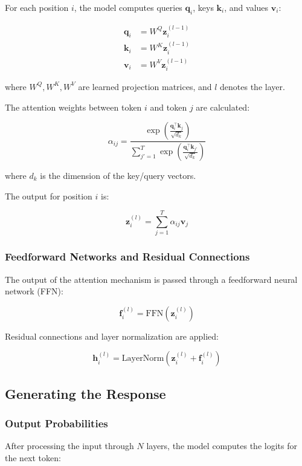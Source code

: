 \documentclass[12pt]{article}
\begin{document}
For each position \( i \), the model computes queries \( \mathbf{q}_i \), keys \( \mathbf{k}_i \), and values \( \mathbf{v}_i \):

\[
\begin{aligned}
\mathbf{q}_i &= W^Q \mathbf{z}_i^{(l-1)} \\
\mathbf{k}_i &= W^K \mathbf{z}_i^{(l-1)} \\
\mathbf{v}_i &= W^V \mathbf{z}_i^{(l-1)}
\end{aligned}
\]

where \( W^Q, W^K, W^V \) are learned projection matrices, and \( l \) denotes the layer.

The attention weights between token \( i \) and token \( j \) are calculated:

\[
\alpha_{ij} = \frac{\exp\left( \frac{\mathbf{q}_i^\top \mathbf{k}_j}{\sqrt{d_k}} \right)}{\sum_{j'=1}^{T} \exp\left( \frac{\mathbf{q}_i^\top \mathbf{k}_{j'}}{\sqrt{d_k}} \right)}
\]

where \( d_k \) is the dimension of the key/query vectors.

The output for position \( i \) is:

\[
\mathbf{z}_i^{(l)} = \sum_{j=1}^{T} \alpha_{ij} \mathbf{v}_j
\]

\subsubsection{Feedforward Networks and Residual Connections}

The output of the attention mechanism is passed through a feedforward neural network (FFN):

\[
\mathbf{f}_i^{(l)} = \text{FFN}(\mathbf{z}_i^{(l)})
\]

Residual connections and layer normalization are applied:

\[
\mathbf{h}_i^{(l)} = \text{LayerNorm}(\mathbf{z}_i^{(l)} + \mathbf{f}_i^{(l)})
\]

\subsection{Generating the Response}

\subsubsection{Output Probabilities}

After processing the input through \( N \) layers, the model computes the logits for the next token:
\end{document}
